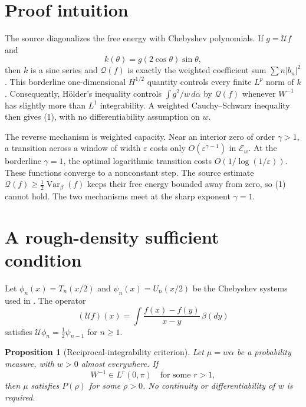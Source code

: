 \documentclass[11pt]{article}
\newtheorem{proposition}[theorem]{Proposition}
\newcommand{\Qf}{\mathcal{Q}}
\newcommand{\E}{\mathcal{E}}
\newcommand{\Var}{\operatorname{Var}}
\begin{document}
\section{Proof intuition}

The source diagonalizes the free energy with Chebyshev polynomials. If
$g=\mathcal U f$ and
\[
 k(\theta)=g(2\cos\theta)\sin\theta,
\]
then $k$ is a sine series and $\Qf(f)$ is exactly the weighted coefficient
sum $\sum n|b_n|^2$. This borderline one-dimensional $H^{1/2}$ quantity
controls every finite $L^p$ norm of $k$. Consequently, H\"older's inequality
controls $\int g^2/w\,d\alpha$ by $\Qf(f)$ whenever $W^{-1}$ has slightly
more than $L^1$ integrability. A weighted Cauchy--Schwarz inequality then
gives (1), with no differentiability assumption on $w$.

The reverse mechanism is weighted capacity. Near an interior zero of order
$\gamma>1$, a transition across a window of width $\varepsilon$ costs only
$O(\varepsilon^{\gamma-1})$ in $\E_w$. At the borderline $\gamma=1$, the
optimal logarithmic transition costs $O(1/\log(1/\varepsilon))$. These
functions converge to a nonconstant step. The source estimate
$\Qf(f)\ge \tfrac12\Var_\beta(f)$ keeps their free energy bounded away from
zero, so (1) cannot hold. The two mechanisms meet at the sharp exponent
$\gamma=1$.

\section{A rough-density sufficient condition}

Let $\phi_n(x)=T_n(x/2)$ and $\psi_n(x)=U_n(x/2)$ be the Chebyshev systems
used in \cite{LP}. The operator
\[
 (\mathcal U f)(x)=\int\frac{f(x)-f(y)}{x-y}\,\beta(dy)
\]
satisfies $\mathcal U\phi_n=\frac12\psi_{n-1}$ for $n\ge1$.

\begin{proposition}[Reciprocal-integrability criterion]\label{prop:suff}
Let $\mu=w\alpha$ be a probability measure, with $w>0$ almost everywhere.
If
\[
 W^{-1}\in L^r(0,\pi)\quad\text{for some }r>1,                 \tag{2}
\]
then $\mu$ satisfies $P(\rho)$ for some $\rho>0$.
No continuity or differentiability of $w$ is required.
\end{proposition}
\end{document}
